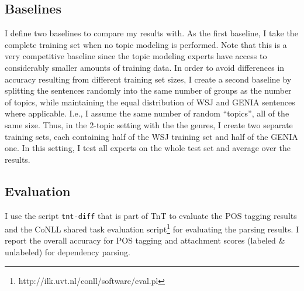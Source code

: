 \subsection{Baselines}

I define two baselines to compare my results with. As the first baseline, I take the complete training set when no topic modeling is performed. Note that this is a very competitive baseline since the topic modeling experts have access to considerably smaller amounts of training data.  In order to avoid differences in accuracy resulting from different training set sizes, I create a second baseline by splitting the sentences randomly into the same number of groups as the number of topics, while maintaining the equal distribution of WSJ and GENIA sentences where applicable. I.e., I assume the same number of random ``topics'', all of the same size. Thus, in the 2-topic setting with the the genres, I create two separate training sets, each containing half of the WSJ training set and half of the GENIA one. In this setting, I test all experts on the whole test set and average over the results.

\subsection{Evaluation}

I use the script \texttt{tnt-diff} that is part of TnT to evaluate the POS tagging results  and the CoNLL shared task evaluation script\footnote{http://ilk.uvt.nl/conll/software/eval.pl} for evaluating the parsing results. I report the overall accuracy for POS tagging and attachment scores (labeled \& unlabeled) for dependency parsing.

